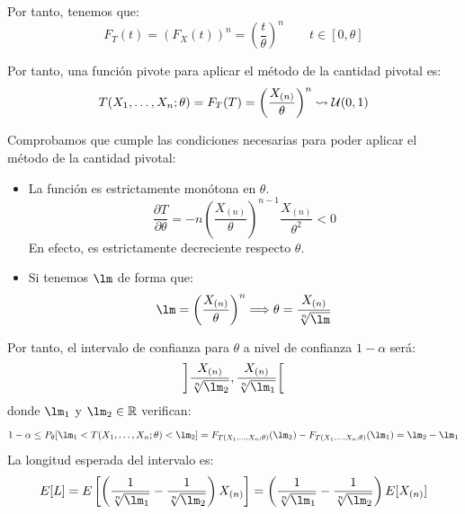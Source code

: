 \begin{ejercicio}
    Por tanto, tenemos que:
    \begin{equation*}
        F_T(t) = {(F_X(t))}^{n} = {\left(\frac{t}{\theta}\right)}^{n} \qquad t\in [0,\theta]
    \end{equation*}

    Por tanto, una función pivote para aplicar el método de la cantidad pivotal es:
    \begin{equation*}
        T(X_1, \ldots, X_n;\theta) = F_T(T) = {\left(\frac{X_{(n)}}{\theta}\right)}^{n} \rightsquigarrow \mathcal{U}(0,1)
    \end{equation*}
    
    Comprobamos que cumple las condiciones necesarias para poder aplicar el método de la cantidad pivotal:
    \begin{itemize}
        \item La función es estrictamente monótona en $\theta$.
        \begin{equation*}
            \frac{\partial T}{\partial \theta} = -n{\left(\frac{X_{(n)}}{\theta}\right)}^{n-1}\frac{X_{(n)}}{\theta^2} < 0
        \end{equation*}
        En efecto, es estrictamente decreciente respecto $\theta$.

        \item Si tenemos $\lm$ de forma que:
            \begin{equation*}
                \lm = {\left(\frac{X_{(n)}}{\theta}\right)}^{n} \Longrightarrow \theta = \frac{X_{(n)}}{\sqrt[n]{\lm}}
            \end{equation*}
    \end{itemize}
    
    Por tanto, el intervalo de confianza para $\theta$ a nivel de confianza $1-\alpha$ será:
    \begin{equation*}
        \left]\frac{X_{(n)}}{\sqrt[n]{\lm_2}},\frac{X_{(n)}}{\sqrt[n]{\lm_1}} \right[
    \end{equation*}
    donde $\lm_1$ y $\lm_2\in \bb{R}$ verifican:
    \begin{equation*}
        1-\alpha\leq P_\theta[\lm_1<T(X_1, \ldots, X_n;\theta)<\lm_2] = F_{T(X_1, \ldots, X_n;\theta)}(\lm_2) - F_{T(X_1, \ldots, X_n;\theta)}(\lm_1) = \lm_2-\lm_1
    \end{equation*}
    La longitud esperada del intervalo es:
    \begin{equation*}
        E[L] = E\left[\left(\frac{1}{\sqrt[n]{\lm_1}} - \frac{1}{\sqrt[n]{\lm_2}}\right) X_{(n)}\right] = \left(\frac{1}{\sqrt[n]{\lm_1}} - \frac{1}{\sqrt[n]{\lm_2}}\right)E[X_{(n)}]
    \end{equation*}


\end{ejercicio}
